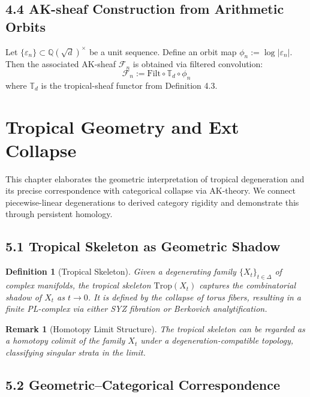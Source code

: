 \documentclass[11pt]{article}
\newtheorem{definition}[theorem]{Definition}
\newtheorem{remark}[theorem]{Remark}
\begin{document}
\subsection{4.4 AK-sheaf Construction from Arithmetic Orbits}

\begin{lemma}
Let $\{\varepsilon_n\} \subset \mathbb{Q}(\sqrt{d})^\times$ be a unit sequence.
Define an orbit map $\phi_n := \log|\varepsilon_n|$.
Then the associated AK-sheaf $\mathcal{F}_n$ is obtained via filtered convolution:
\[
\mathcal{F}_n := \mathrm{Filt} \circ \mathbb{T}_d \circ \phi_n
\]
where $\mathbb{T}_d$ is the tropical-sheaf functor from Definition 4.3.
\end{lemma}


\section{Tropical Geometry and Ext Collapse}

This chapter elaborates the geometric interpretation of tropical degeneration and its precise correspondence with categorical collapse via AK-theory. We connect piecewise-linear degenerations to derived category rigidity and demonstrate this through persistent homology.

\subsection{5.1 Tropical Skeleton as Geometric Shadow}

\begin{definition}[Tropical Skeleton]
Given a degenerating family $\{ X_t \}_{t \in \Delta}$ of complex manifolds, the tropical skeleton $\mathrm{Trop}(X_t)$ captures the combinatorial shadow of $X_t$ as $t \to 0$. It is defined by the collapse of torus fibers, resulting in a finite PL-complex via either SYZ fibration or Berkovich analytification.
\end{definition}

\begin{remark}[Homotopy Limit Structure]
The tropical skeleton can be regarded as a homotopy colimit of the family $X_t$ under a degeneration-compatible topology, classifying singular strata in the limit.
\end{remark}

\subsection{5.2 Geometric–Categorical Correspondence}
\end{document}

